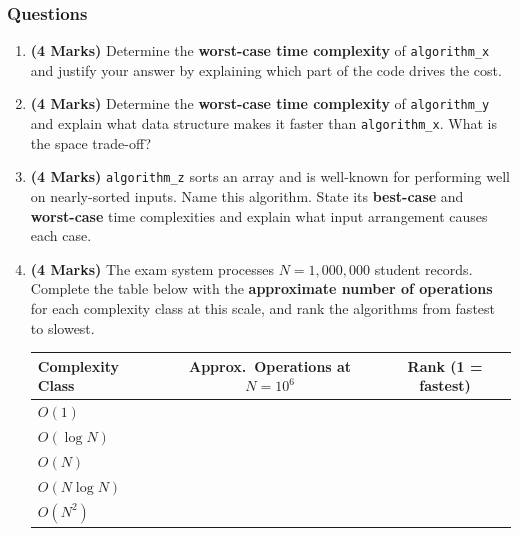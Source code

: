 \documentclass[11pt,a4paper]{article}
\begin{document}
\subsubsection*{Questions}
\begin{enumerate}[label=\textbf{A\arabic*.}]
    \item \textbf{(4 Marks)} Determine the \textbf{worst-case time complexity} of \texttt{algorithm\_x} and justify your answer by explaining which part of the code drives the cost.

    \item \textbf{(4 Marks)} Determine the \textbf{worst-case time complexity} of \texttt{algorithm\_y} and explain what data structure makes it faster than \texttt{algorithm\_x}. What is the space trade-off?

    \item \textbf{(4 Marks)} \texttt{algorithm\_z} sorts an array and is well-known for performing well on nearly-sorted inputs. Name this algorithm. State its \textbf{best-case} and \textbf{worst-case} time complexities and explain what input arrangement causes each case.

    \item \textbf{(4 Marks)} The exam system processes $N = 1{,}000{,}000$ student records. Complete the table below with the \textbf{approximate number of operations} for each complexity class at this scale, and rank the algorithms from fastest to slowest.

    \vspace{0.3cm}
    \begin{center}
    \begin{tabular}{lcc}
        \toprule
        \textbf{Complexity Class} & \textbf{Approx.\ Operations at $N = 10^6$} & \textbf{Rank (1 = fastest)} \\
        \midrule
        $O(1)$        & \underline{\hspace{3cm}} & \underline{\hspace{2cm}} \\
        $O(\log N)$   & \underline{\hspace{3cm}} & \underline{\hspace{2cm}} \\
        $O(N)$        & \underline{\hspace{3cm}} & \underline{\hspace{2cm}} \\
        $O(N \log N)$ & \underline{\hspace{3cm}} & \underline{\hspace{2cm}} \\
        $O(N^2)$      & \underline{\hspace{3cm}} & \underline{\hspace{2cm}} \\
        \bottomrule
    \end{tabular}
    \end{center}


\end{enumerate}
\end{document}
